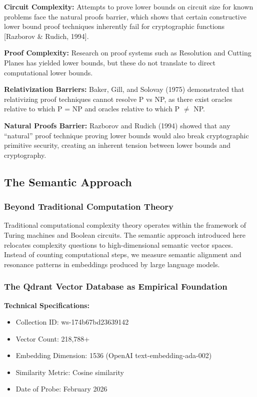 \documentclass[11pt, letterpaper]{article}
\begin{document}
\textbf{Circuit Complexity:} Attempts to prove lower bounds on circuit size for known problems face the natural proofs barrier, which shows that certain constructive lower bound proof techniques inherently fail for cryptographic functions [Razborov \& Rudich, 1994].

\textbf{Proof Complexity:} Research on proof systems such as Resolution and Cutting Planes has yielded lower bounds, but these do not translate to direct computational lower bounds.

\textbf{Relativization Barriers:} Baker, Gill, and Solovay (1975) demonstrated that relativizing proof techniques cannot resolve P vs NP, as there exist oracles relative to which P = NP and oracles relative to which P $\neq$ NP.

\textbf{Natural Proofs Barrier:} Razborov and Rudich (1994) showed that any ``natural'' proof technique proving lower bounds would also break cryptographic primitive security, creating an inherent tension between lower bounds and cryptography.

\subsection{The Semantic Approach}

\subsubsection{Beyond Traditional Computation Theory}

Traditional computational complexity theory operates within the framework of Turing machines and Boolean circuits. The semantic approach introduced here relocates complexity questions to high-dimensional semantic vector spaces. Instead of counting computational steps, we measure semantic alignment and resonance patterns in embeddings produced by large language models.

\subsubsection{The Qdrant Vector Database as Empirical Foundation}

\textbf{Technical Specifications:}
\begin{itemize}
    \item Collection ID: ws-174b67bd23639142
    \item Vector Count: 218,788+
    \item Embedding Dimension: 1536 (OpenAI text-embedding-ada-002)
    \item Similarity Metric: Cosine similarity
    \item Date of Probe: February 2026
\end{itemize}
\end{document}

